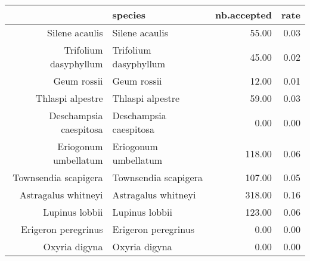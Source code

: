 \begin{table}[ht]
\centering
\begin{tabular}{rlrr}
  \hline
 & species & nb.accepted & rate \\
  \hline
Silene acaulis & Silene acaulis & 55.00 & 0.03 \\
  Trifolium dasyphyllum & Trifolium dasyphyllum & 45.00 & 0.02 \\
  Geum rossii & Geum rossii & 12.00 & 0.01 \\
  Thlaspi alpestre & Thlaspi alpestre & 59.00 & 0.03 \\
  Deschampsia caespitosa & Deschampsia caespitosa & 0.00 & 0.00 \\
  Eriogonum umbellatum & Eriogonum umbellatum & 118.00 & 0.06 \\
  Townsendia scapigera & Townsendia scapigera & 107.00 & 0.05 \\
  Astragalus whitneyi & Astragalus whitneyi & 318.00 & 0.16 \\
  Lupinus lobbii & Lupinus lobbii & 123.00 & 0.06 \\
  Erigeron peregrinus & Erigeron peregrinus & 0.00 & 0.00 \\
  Oxyria digyna & Oxyria digyna & 0.00 & 0.00 \\
   \hline
\end{tabular}
\end{table}